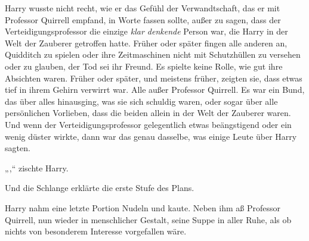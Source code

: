 Harry wusste nicht recht, wie er das Gefühl der Verwandtschaft, das er mit Professor Quirrell empfand, in Worte fassen sollte, außer zu sagen, dass der Verteidigungsprofessor die einzige \emph{klar denkende} Person war, die Harry in der Welt der Zauberer getroffen hatte. Früher oder später fingen alle anderen an, Quidditch zu spielen oder ihre Zeitmaschinen nicht mit Schutzhüllen zu versehen oder zu glauben, der Tod sei ihr Freund. Es spielte keine Rolle, wie gut ihre Absichten waren. Früher oder später, und meistens früher, zeigten sie, dass etwas tief in ihrem Gehirn verwirrt war. Alle außer Professor Quirrell. Es war ein Bund, das über alles hinausging, was sie sich schuldig waren, oder sogar über alle persönlichen Vorlieben, dass die beiden allein in der Welt der Zauberer waren. Und wenn der Verteidigungsprofessor gelegentlich etwas beängstigend oder ein wenig düster wirkte, dann war das genau dasselbe, was einige Leute über Harry sagten.

„,“ zischte Harry.

Und die Schlange erklärte die erste Stufe des Plans.

\later

Harry nahm eine letzte Portion Nudeln und kaute. Neben ihm aß Professor Quirrell, nun wieder in menschlicher Gestalt, seine Suppe in aller Ruhe, als ob nichts von besonderem Interesse vorgefallen wäre.


